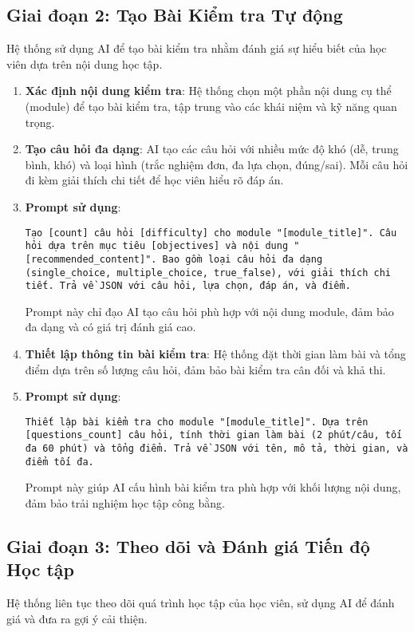 \subsection{Giai đoạn 2: Tạo Bài Kiểm tra Tự động}
Hệ thống sử dụng AI để tạo bài kiểm tra nhằm đánh giá sự hiểu biết của học viên dựa trên nội dung học tập.

\begin{enumerate}
	\item \textbf{Xác định nội dung kiểm tra}: Hệ thống chọn một phần nội dung cụ thể (module) để tạo bài kiểm tra, tập trung vào các khái niệm và kỹ năng quan trọng.

	\item \textbf{Tạo câu hỏi đa dạng}: AI tạo các câu hỏi với nhiều mức độ khó (dễ, trung bình, khó) và loại hình (trắc nghiệm đơn, đa lựa chọn, đúng/sai). Mỗi câu hỏi đi kèm giải thích chi tiết để học viên hiểu rõ đáp án.

	\item \textbf{Prompt sử dụng}:
	      \begin{Verbatim}[breaklines=true]
		      Tạo [count] câu hỏi [difficulty] cho module "[module_title]". Câu hỏi dựa trên mục tiêu [objectives] và nội dung "[recommended_content]". Bao gồm loại câu hỏi đa dạng (single_choice, multiple_choice, true_false), với giải thích chi tiết. Trả về JSON với câu hỏi, lựa chọn, đáp án, và điểm.
	      \end{Verbatim}
	      Prompt này chỉ đạo AI tạo câu hỏi phù hợp với nội dung module, đảm bảo đa dạng và có giá trị đánh giá cao.

	\item \textbf{Thiết lập thông tin bài kiểm tra}: Hệ thống đặt thời gian làm bài và tổng điểm dựa trên số lượng câu hỏi, đảm bảo bài kiểm tra cân đối và khả thi.

	\item \textbf{Prompt sử dụng}:
	      \begin{Verbatim}[breaklines=true]
		      Thiết lập bài kiểm tra cho module "[module_title]". Dựa trên [questions_count] câu hỏi, tính thời gian làm bài (2 phút/câu, tối đa 60 phút) và tổng điểm. Trả về JSON với tên, mô tả, thời gian, và điểm tối đa.
	      \end{Verbatim}
	      Prompt này giúp AI cấu hình bài kiểm tra phù hợp với khối lượng nội dung, đảm bảo trải nghiệm học tập công bằng.
\end{enumerate}

\subsection{Giai đoạn 3: Theo dõi và Đánh giá Tiến độ Học tập}
Hệ thống liên tục theo dõi quá trình học tập của học viên, sử dụng AI để đánh giá và đưa ra gợi ý cải thiện.

